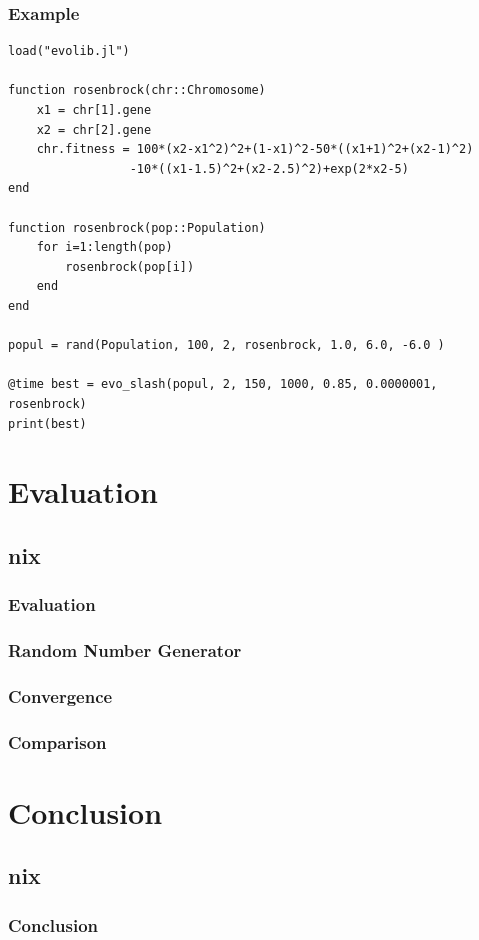 \documentclass[%
14pt
]{beamer}
\begin{document}
\begin{frame}[fragile]
  \frametitle{Example}
  \vspace{-0.5cm}
{\scriptsize
\begin{verbatim}
load("evolib.jl")

function rosenbrock(chr::Chromosome)
    x1 = chr[1].gene
    x2 = chr[2].gene
    chr.fitness = 100*(x2-x1^2)^2+(1-x1)^2-50*((x1+1)^2+(x2-1)^2)
                 -10*((x1-1.5)^2+(x2-2.5)^2)+exp(2*x2-5)
end

function rosenbrock(pop::Population)
    for i=1:length(pop)
        rosenbrock(pop[i])
    end
end

popul = rand(Population, 100, 2, rosenbrock, 1.0, 6.0, -6.0 )

@time best = evo_slash(popul, 2, 150, 1000, 0.85, 0.0000001, rosenbrock)
print(best)

\end{verbatim}}
\end{frame}





\section{Evaluation}
\subsection{nix}
\begin{frame}
  \frametitle{Evaluation}
\end{frame}

\begin{frame}
  \frametitle{Random Number Generator}
\end{frame}

\begin{frame}
  \frametitle{Convergence}
\end{frame}

\begin{frame}
  \frametitle{Comparison}
\end{frame}

\section{Conclusion}
\subsection{nix}
\begin{frame}
  \frametitle{Conclusion}
\end{frame}
\end{document}
